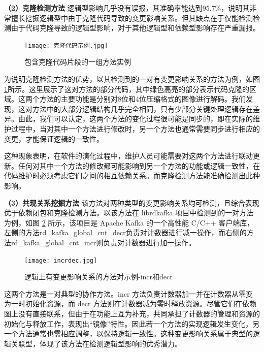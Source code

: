 \textbf{（2）克隆检测方法} \hspace{2mm}逻辑型影响几乎没有误报，其准确率能达到95.7\%，说明其非常擅长挖掘逻辑型中由于克隆代码导致的变更影响关系。但其缺点在于仅能检测检测由于代码克隆导致的逻辑型影响，对于其他逻辑型和依赖型影响存在严重漏报。

\begin{figure}[h]
\centering
\texttt{[image: 克隆代码示例.jpg]}
\caption{包含克隆代码片段的一组方法实例}
\label{1_包含克隆代码片段的一组方法实例}
\end{figure}
    
为说明克隆检测方法的优势，以其检测到的一对有变更影响关系的方法为例，如图\ref{1_包含克隆代码片段的一组方法实例}所示。这里展示了这对方法的部分代码，其中绿色高亮的部分表示代码克隆的区域。这两个方法的主要功能是分别对8位和4位压缩格式的图像进行解码。我们发现，这对方法中的大部分逻辑结构几乎完全相同，只有少部分关键处理逻辑存在差异。由此，我们可以认定，这两个方法的变化过程很可能是同步的，即在实际的维护过程中，当对其中一个方法进行修改时，另一个方法也通常需要同步进行相应的变更，才能保证逻辑的一致性。



这种现象表明，在软件的演化过程中，维护人员可能需要对这两个方法进行联动更新。任何对其中一个方法的修改都可能影响到另一个方法的功能或逻辑一致性，在代码维护时必须考虑它们之间的相互依赖关系。而克隆检测方法能准确检测出此种影响。

\textbf{（3）共现关系挖掘方法} \hspace{2mm}该方法对两种类型的变更影响关系均可检测，且综合表现优于依赖闭包和克隆检测方法。以该方法在 librdkafka 项目中检测到的一对方法为例，如图 \ref{1_逻辑上有变更影响关系的方法对示例-incr和decr} 所示，该项目是 Apache Kafka 的一个高性能 C/C++ 客户端库，左侧的方法rd\_kafka\_global\_cnt\_decr负责对计数器进行减一操作，而右侧的方法rd\_kafka\_global\_cnt\_incr则负责对计数器进行加一操作。

\begin{figure}[h]
\centering
\texttt{[image: incrdec.jpg]}
\caption{逻辑上有变更影响关系的方法对示例-incr和decr}
\label{1_逻辑上有变更影响关系的方法对示例-incr和decr}
\end{figure}

这两个方法是一对典型的协作方法。incr 方法负责计数器加一并在计数器从零变为一时初始化资源，而 decr 方法则在计数器减为零时释放资源。尽管它们在依赖图上没有直接联系，但由于在功能上互为补充，共同承担了计数器的管理和资源的初始化与释放工作，表现出“镜像”特性。因此若一个方法的实现逻辑发生变化，另一个方法通常也需相应调整，以保持逻辑一致性。这种变更影响关系属于典型的逻辑关联型，体现了该方法在检测逻辑型影响的优秀潜力。

